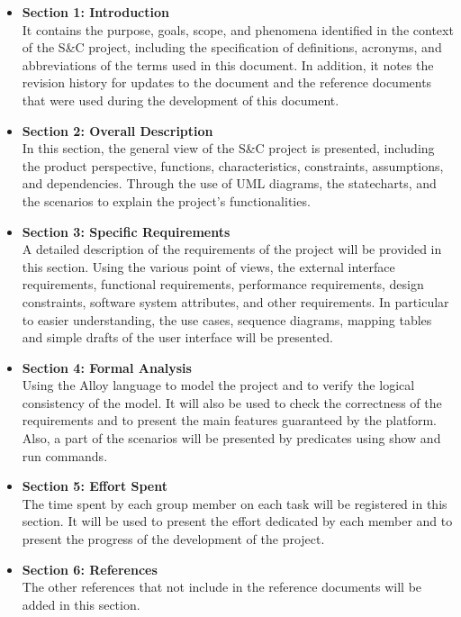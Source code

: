 \begin{itemize}
    \item \textbf{Section 1: Introduction} 
    \\It contains the purpose, goals, scope, and phenomena identified in the context of the S\&C project, 
    including the specification of definitions, acronyms, and abbreviations of the terms used in this document. In addition, it notes the revision 
    history for updates to the document and the reference documents that were used during the development of this document.
    \item \textbf{Section 2: Overall Description}
    \\ In this section, the general view of the S\&C project is presented, including the product perspective, functions, characteristics, 
    constraints, assumptions, and dependencies. Through the use of UML diagrams, the statecharts, and the scenarios to explain the project's 
    functionalities.
    \item \textbf{Section 3: Specific Requirements}
    \\ A detailed description of the requirements of the project will be provided in this section. Using the various point of views, the external   
    interface requirements, functional requirements, performance requirements, design constraints, software system attributes, and other 
    requirements. In particular to easier understanding, the use cases, sequence diagrams, mapping tables and simple drafts of the user interface 
    will be presented.
    \item \textbf{Section 4: Formal Analysis}
    \\ Using the Alloy language to model the project and to verify the logical consistency of the model. It will also be used to check the
    correctness of the requirements and to present the main features guaranteed by the platform. Also, a part of the scenarios will be presented 
    by predicates using show and run commands.
    \item \textbf{Section 5: Effort Spent}
    \\The time spent by each group member on each task will be registered in this section. It will be used to present the effort dedicated 
    by each member and to present the progress of the development of the project.
    \item \textbf{Section 6: References}
    \\ The other references that not include in the reference documents will be added in this section.
\end{itemize}